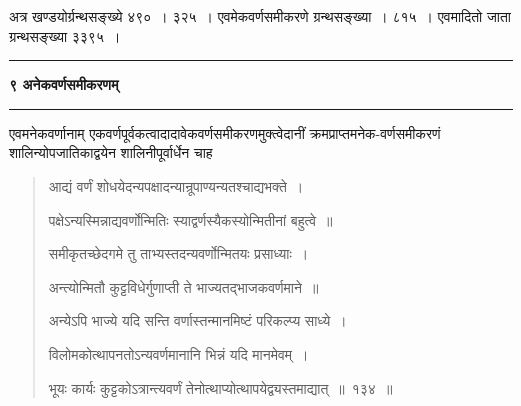 \documentclass[11pt, openany]{book}
\begin{document}
 अत्र खण्डयोर्ग्रन्थसङ्ख्ये ४९०~। ३२५~। एवमेकवर्णसमीकरणे ग्रन्थसङ्ख्या~।
८१५~। एवमादितो जाता ग्रन्थसङ्ख्या ३३९५~।\\
\begin{center}
    \rule{0.2\textwidth}{0.5pt}
\end{center}
\newpage
 \label{ch9}
\begin{center}
    {\LARGE \textbf{९ अनेकवर्णसमीकरणम्}}\\
\rule{0.2\textwidth}{0.5pt}
\end{center}

 एवमनेकवर्णानाम् एकवर्णपूर्वकत्वादादावेकवर्णसमीकरणमुक्त्वेदानीं क्रमप्राप्तमनेक-वर्णसमीकरणं शालिन्योपजातिकाद्वयेन शालिनीपूर्वार्धेन चाह\textendash
 
 \label{134}
\begin{quote}
    \ab 
\hspace{-8mm} आद्यं वर्णं शोधयेदन्यपक्षादन्यान्रूपाण्यन्यतश्चाद्यभक्ते~। \\
\vspace{-7mm}

\hspace{-8mm} पक्षेऽन्यस्मिन्नाद्यवर्णोन्मितिः स्याद्वर्णस्यैकस्योन्मितीनां बहुत्वे~॥~\\
\vspace{-7mm}

\hspace{-8mm} समीकृतच्छेदगमे तु ताभ्यस्तदन्यवर्णोन्मितयः प्रसाध्याः~। \\
\vspace{-7mm}

\hspace{-8mm} अन्त्योन्मितौ कुट्टविधेर्गुणाप्ती ते भाज्यतद्भाजकवर्णमाने~॥~\\
\vspace{-7mm}

\hspace{-8mm} अन्येऽपि भाज्ये यदि सन्ति वर्णास्तन्मानमिष्टं परिकल्प्य साध्ये~। \\
\vspace{-7mm}

\hspace{-8mm} विलोमकोत्थापनतोऽन्यवर्णमानानि भिन्नं यदि मानमेवम्~। \\
\vspace{-7mm}

\hspace{-8mm} भूयः कार्यः कुट्टकोऽत्रान्त्यवर्णं तेनोत्थाप्योत्थापयेद्व्यस्तमाद्यात्~॥~१३४~॥
\end{quote}
\end{document}
